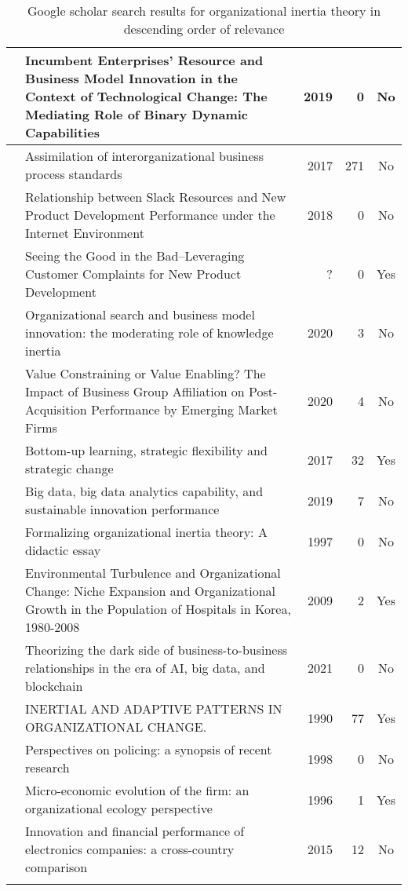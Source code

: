 \begin{longtable}{
    |>{\raggedright\arraybackslash}p{3.7cm}
    |>{\raggedright\arraybackslash}p{3.7cm}
    |r
    |r
    |c
    |}
	\hline
	\cite{guiwen2019incumbent} & Incumbent Enterprises' Resource and Business Model Innovation in the Context of Technological Change: The Mediating Role of Binary Dynamic Capabilities & 2019 & 0 & No \\
	\hline
	\cite{bala2007assimilation} & Assimilation of interorganizational business process standards & 2017 & 271 & No \\
	\hline
	\cite{yi2018relationship} & Relationship between Slack Resources and New Product Development Performance under the Internet Environment & 2018 & 0 & No \\
	\hline
	\cite{polthierseeing} & Seeing the Good in the Bad–Leveraging Customer Complaints for New Product Development & ? & 0 & Yes \\
	\hline
	\cite{yu2020organizational} & Organizational search and business model innovation: the moderating role of knowledge inertia & 2020 & 3 & No \\
	\hline
	\cite{popli2020value} & Value Constraining or Value Enabling? The Impact of Business Group Affiliation on Post-Acquisition Performance by Emerging Market Firms & 2020 & 4 & No \\
	\hline
	\cite{yi2017bottom} & Bottom-up learning, strategic flexibility and strategic change & 2017 & 32 & Yes \\
	\hline
	\cite{hao2019big} & Big data, big data analytics capability, and sustainable innovation performance & 2019 & 7 & No \\
	\hline
	\cite{bruggeman1997formalizing} & Formalizing organizational inertia theory: A didactic essay & 1997 & 0 & No \\
	\hline
	\cite{jung2009environmental} & Environmental Turbulence and Organizational Change: Niche Expansion and Organizational Growth in the Population of Hospitals in Korea, 1980-2008 & 2009 & 2 & Yes \\ 
	\hline
	\cite{gligor2021theorizing} & Theorizing the dark side of business-to-business relationships in the era of AI, big data, and blockchain & 2021 & 0 & No \\
	\hline
	\cite{baum1990inertial} & INERTIAL AND ADAPTIVE PATTERNS IN ORGANIZATIONAL CHANGE. & 1990 & 77 & Yes \\
	\hline
	\cite{hughes1998perspectives} & Perspectives on policing: a synopsis of recent research & 1998 & 0 & No \\
	\hline
	\cite{ng1996micro} & Micro-economic evolution of the firm: an organizational ecology perspective & 1996 & 1 & Yes \\
	\hline 
	\cite{cortez2015innovation} & Innovation and financial performance of electronics companies: a cross-country comparison & 2015 & 12 & No \\
	\hline 	
	\caption{Google scholar search results for organizational inertia theory in descending order of relevance} 
\end{longtable} 



